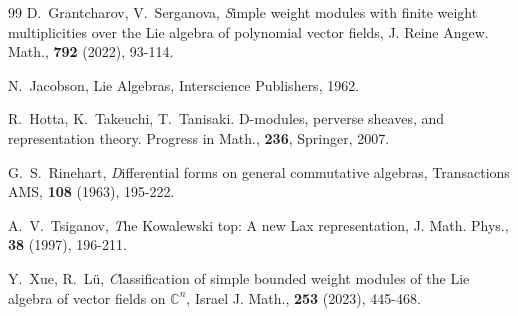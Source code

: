 \documentclass[12pt]{amsart}
\begin{document}
\begin{thebibliography}{99}
D.~Grantcharov, V.~Serganova, 
{\emph Simple weight modules with finite weight multiplicities over the
Lie algebra of polynomial vector fields}, 
J. Reine Angew. Math., {\bf 792} (2022), 93-114.

N.~Jacobson,  Lie Algebras, Interscience Publishers, 1962.

R.~Hotta, K.~Takeuchi, T.~Tanisaki. 
D-modules, perverse sheaves, and representation theory. Progress in Math., {\bf 236}, Springer, 2007.

G.~S.~Rinehart,
{\emph Differential forms on general commutative algebras},
Transactions AMS, {\bf 108} (1963), 195-222.

A.~V.~Tsiganov,
{\emph The Kowalewski top: A new Lax representation},
J. Math. Phys., {\bf 38} (1997), 196-211. 

Y.~Xue, R.~L\"u, 
{\emph Classification of simple bounded weight modules of the Lie algebra of vector
fields on ${\mathbb C}^n$}, 
Israel J.  Math., {\bf 253} (2023), 445-468.

\end{thebibliography}
\end{document}
